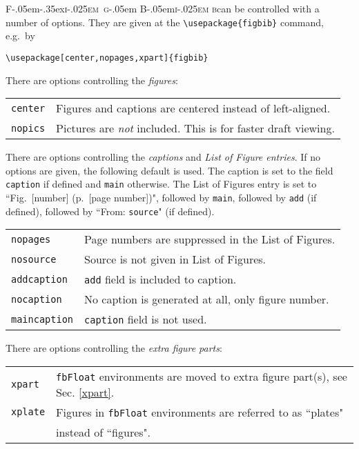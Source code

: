 \documentclass{ltxdoc}
\def\FigBib{{\rmfamily F\kern-.05em\lower-.35ex\hbox{\textsc{i\kern-.025em g}}\kern-.05em%
    B\kern-.05em\textsc{i\kern-.025em b}}}
\begin{document}
\FigBib can be controlled with a number of options. They are given
at the \verb+\usepackage{figbib}+ command, e.g.\ by
\begin{verbatim}
\usepackage[center,nopages,xpart]{figbib}
\end{verbatim}

There are options controlling the \emph{figures}:

\begin{tabular}{l l}
\texttt{center} & Figures and captions are centered instead of left-aligned.\\
\texttt{nopics} & Pictures are \emph{not} included. This is for
faster draft viewing.
\end{tabular}

There are options controlling the \emph{captions} and \emph{List
of Figure entries}. If no options are given, the following default
is used. The caption is set to the field \texttt{caption} if
defined and \texttt{main} otherwise. The List of Figures entry is
set to ``Fig.~[number] (p.~[page number])", followed by
\texttt{main}, followed by \texttt{add} (if defined), followed by
``From: \texttt{source}" (if defined).

\begin{tabular}{l l}
\texttt{nopages} & Page numbers are suppressed in the List of Figures.\\
\texttt{nosource} & Source is not given in List of Figures.\\
\texttt{addcaption} & \texttt{add} field is included to caption.\\
\texttt{nocaption} & No caption is generated at all, only figure number.\\
\texttt{maincaption} & \texttt{caption} field is not used.
\end{tabular}

There are options controlling the \emph{extra figure parts}:

\begin{tabular}{l l}
\texttt{xpart} & \texttt{fbFloat} environments are moved to extra figure part(s), see Sec. \ref{xpart}.\\
\texttt{xplate} & Figures in \texttt{fbFloat} environments are
referred to as ``plates"\\
& instead of ``figures".
\end{tabular}
\end{document}
